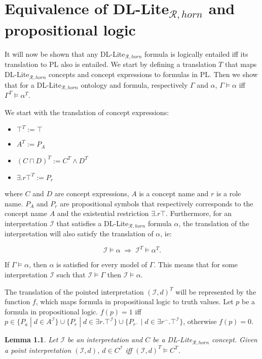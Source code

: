 \chapter{Equivalence of DL-Lite$_{\mathcal{R}, horn}$ and propositional logic}

\newtheorem{lemma}{Lemma}

It will now be shown that any DL-Lite$_{\mathcal{R}, horn}$ formula is logically entailed iff its translation to PL also is entailed. We start by defining a translation $T$ that maps DL-Lite$_{\mathcal{R}, horn}$ concepts and concept expressions to formulas in PL. Then we show that for a DL-Lite$_{\mathcal{R}, horn}$ ontology and formula, respectively $\Gamma$ and $\alpha$, $\Gamma \models \alpha$ iff $\Gamma^T \models \alpha^T$.

We start with the translation of concept expressions:
\begin{itemize}
    \item $\top^T := \top$
    \item $A^T := P_A$
    \item $(C \sqcap D)^T := C^T \wedge D^T$
    \item ${\exists .r\top}^T := P_r$
\end{itemize}
 where $C$ and $D$ are concept expressions, $A$ is a concept name and $r$ is a role name. $P_A$ and $P_r$ are propositional symbols that respectively corresponds to the concept name $A$ and the existential restriction $\exists .r\top$. Furthermore, for an interpretation $\mathcal{I}$ that satisfies a DL-Lite$_{\mathcal{R}, horn}$ formula $\alpha$, the translation of the interpretation will also satisfy the translation of $\alpha$, ie:
 
 \[\mathcal{I} \models \alpha \; \Rightarrow \;  \mathcal{I}^T \models \alpha^T.\]
 
If $\Gamma \models \alpha$, then $\alpha$ is satisfied for every model of $\Gamma$. This means that for some interpretation $\mathcal{I}$ such that $\mathcal{I} \models \Gamma$ then $\mathcal{I} \models \alpha$.

The translation of the pointed interpretation $(\mathcal{I}, d)^T$ will be represented by the function $f$, which maps formula in propositional logic to truth values. Let $p$ be a formula in propositional logic. $f(p)=1$ iff $p\in \{P_a \; | \; d\in A^{\mathcal{I}}\}\cup\{P_r \; | \; d\in {\exists r.\top}^{\mathcal{I}}\}\cup \{P_{r^-} \; | \; d \in {\exists r^{-}.\top}^{\mathcal{I}}\}$, otherwise $f(p)=0$.
 
\begin{lemma}
Let $\mathcal{I}$ be an interpretation and $C$ be a DL-Lite$_{\mathcal{R}, horn}$ concept. Given a point interpretation $(\mathcal{I}, d)$, $d \in C^{\mathcal{I}}$ iff $(\mathcal{I}, d)^T \models C^T$.
\end{lemma}


